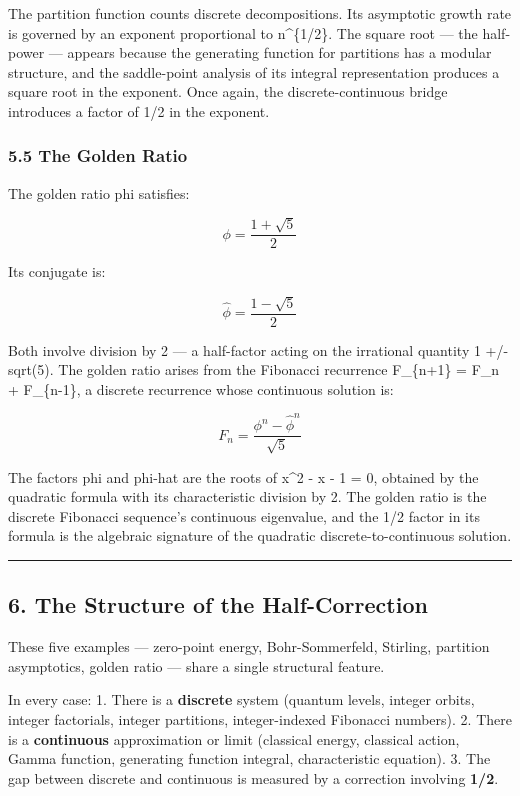 \documentclass[
]{article}
\begin{document}
The partition function counts discrete decompositions. Its asymptotic
growth rate is governed by an exponent proportional to n\^{}\{1/2\}. The
square root --- the half-power --- appears because the generating
function for partitions has a modular structure, and the saddle-point
analysis of its integral representation produces a square root in the
exponent. Once again, the discrete-continuous bridge introduces a factor
of 1/2 in the exponent.

\subsubsection{5.5 The Golden Ratio}\label{the-golden-ratio}

The golden ratio phi satisfies:

\[\phi = \frac{1 + \sqrt{5}}{2}\]

Its conjugate is:

\[\hat{\phi} = \frac{1 - \sqrt{5}}{2}\]

Both involve division by 2 --- a half-factor acting on the irrational
quantity 1 +/- sqrt(5). The golden ratio arises from the Fibonacci
recurrence F\_\{n+1\} = F\_n + F\_\{n-1\}, a discrete recurrence whose
continuous solution is:

\[F_n = \frac{\phi^n - \hat{\phi}^n}{\sqrt{5}}\]

The factors phi and phi-hat are the roots of x\^{}2 - x - 1 = 0,
obtained by the quadratic formula with its characteristic division by 2.
The golden ratio is the discrete Fibonacci sequence's continuous
eigenvalue, and the 1/2 factor in its formula is the algebraic signature
of the quadratic discrete-to-continuous solution.

\begin{center}\rule{0.5\linewidth}{0.5pt}\end{center}

\subsection{6. The Structure of the
Half-Correction}\label{the-structure-of-the-half-correction}

These five examples --- zero-point energy, Bohr-Sommerfeld, Stirling,
partition asymptotics, golden ratio --- share a single structural
feature.

In every case: 1. There is a \textbf{discrete} system (quantum levels,
integer orbits, integer factorials, integer partitions, integer-indexed
Fibonacci numbers). 2. There is a \textbf{continuous} approximation or
limit (classical energy, classical action, Gamma function, generating
function integral, characteristic equation). 3. The gap between discrete
and continuous is measured by a correction involving \textbf{1/2}.
\end{document}
